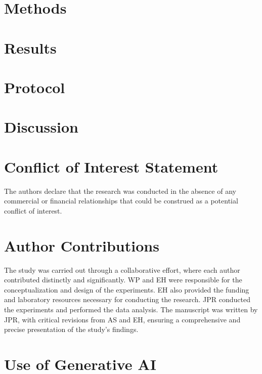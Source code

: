 \documentclass[utf8]{FrontiersinHarvard}
\begin{document}
    \section{Methods}
    


    \section{Results}
    


    \section{Protocol}
    


    \section{Discussion}
    

    \section*{Conflict of Interest Statement}
    The authors declare that the research was conducted in the absence of any commercial or financial relationships
    that could be construed as a potential conflict of interest.

    \section*{Author Contributions}
    The study was carried out through a collaborative effort, where each author contributed distinctly and
    significantly.
    WP and EH were responsible for the conceptualization and design of the experiments.
    EH also provided the funding and laboratory resources necessary for conducting the research.
    JPR conducted the experiments and performed the data analysis.
    The manuscript was written by JPR, with critical revisions from AS and EH, ensuring a comprehensive and precise
    presentation of the study's findings.

    \section*{Use of Generative AI}
\end{document}
